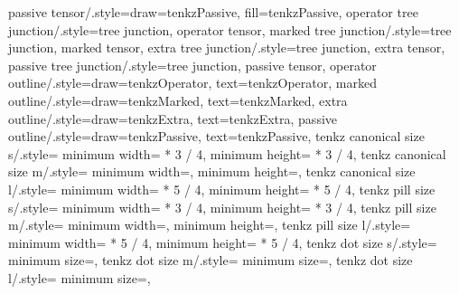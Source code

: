 {  passive tensor/.style={draw=tenkzPassive, fill=tenkzPassive},
  operator tree junction/.style={tree junction, operator tensor},
  marked tree junction/.style={tree junction, marked tensor},
  extra tree junction/.style={tree junction, extra tensor},
  passive tree junction/.style={tree junction, passive tensor},
  operator outline/.style={draw=tenkzOperator, text=tenkzOperator},
  marked outline/.style={draw=tenkzMarked, text=tenkzMarked},
  extra outline/.style={draw=tenkzExtra, text=tenkzExtra},
  passive outline/.style={draw=tenkzPassive, text=tenkzPassive},
  tenkz canonical size s/.style={
      minimum width=\dimexpr
        \tenkz@r@glyphref\tenkz@pitch * 3 / 4\relax,
      minimum height=\dimexpr
        \tenkz@r@glyphref\tenkz@pitch * 3 / 4\relax},
  tenkz canonical size m/.style={
      minimum width=\tenkz@dim{\tenkz@r@glyphref},
      minimum height=\tenkz@dim{\tenkz@r@glyphref}},
  tenkz canonical size l/.style={
      minimum width=\dimexpr
        \tenkz@r@glyphref\tenkz@pitch * 5 / 4\relax,
      minimum height=\dimexpr
        \tenkz@r@glyphref\tenkz@pitch * 5 / 4\relax},
  tenkz pill size s/.style={
      minimum width=\dimexpr
        \tenkz@r@glyphref\tenkz@pitch * 3 / 4\relax,
      minimum height=\dimexpr
        \tenkz@r@glyphbox\tenkz@pitch * 3 / 4\relax},
  tenkz pill size m/.style={
      minimum width=\tenkz@dim{\tenkz@r@glyphref},
      minimum height=\tenkz@dim{\tenkz@r@glyphbox}},
  tenkz pill size l/.style={
      minimum width=\dimexpr
        \tenkz@r@glyphref\tenkz@pitch * 5 / 4\relax,
      minimum height=\dimexpr
        \tenkz@r@glyphbox\tenkz@pitch * 5 / 4\relax},
  tenkz dot size s/.style={
      minimum size=\tenkz@dim{\tenkz@r@clusterdot}},
  tenkz dot size m/.style={
      minimum size=\tenkz@dim{\tenkz@r@dotdia}},
  tenkz dot size l/.style={
      minimum size=\tenkz@dim{\tenkz@r@glyphbox}},
}

